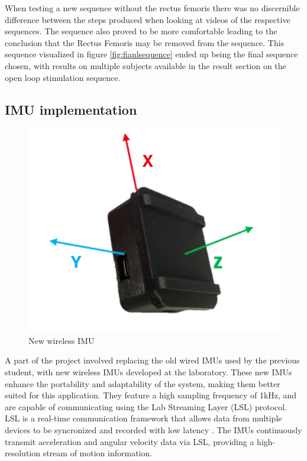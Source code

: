 When testing a new sequence without the rectus femoris there was no discernible difference between the steps produced when looking at videos of the respective sequences. The sequence also proved to be more comfortable leading to the conclusion that the Rectus Femoris may be removed from the sequence. This sequence visualized in figure \ref{fig:fianlsequence} ended up being the final sequence chosen, with results on multiple subjects available in the result section on the open loop stimulation sequence.



\subsection{IMU implementation}
\begin{figure}
        \centering
    \includegraphics[width=\linewidth]{images/IMU_directions.png}
    \caption{New wireless IMU}
    \label{fig:imudirection}
\end{figure}
A part of the project involved replacing the old wired IMUs used by the previous student, with new wireless IMUs developed at the laboratory. These new IMUs enhance the portability and adaptability of the system, making them better suited for this application. They feature a high sampling frequency of 1kHz, and are capable of communicating using the Lab Streaming Layer (LSL) protocol. LSL is a real-time communication framework that allows data from multiple devices to be syncronized and recorded with low latency . The IMUs continuously transmit acceleration and angular velocity data via LSL, providing a high-resolution stream of motion information.

